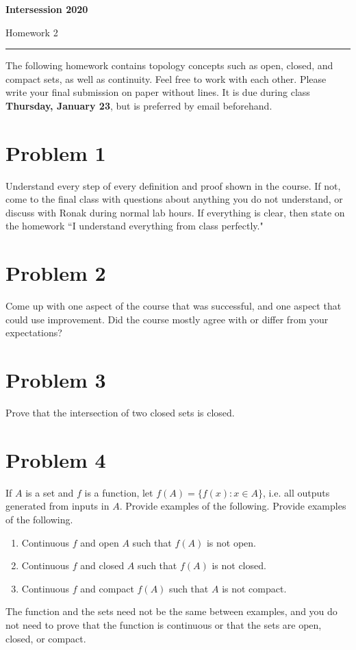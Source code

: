 \documentclass[11pt]{article}
\theoremstyle{plain}
\theoremstyle{definition}
\theoremstyle{remark}
\begin{document}

 \hfill {\bf Intersession 2020}

 \hfill 
{Homework 2}

\noindent \rule[0.1in]{\textwidth}{0.4pt}

The following homework contains topology concepts such as open, closed, and compact sets, as well as continuity. Feel free to work with each other. Please write your final submission on paper without lines. It is due during class {\bf Thursday, January 23}, but is preferred by email beforehand.


\section*{Problem 1}

Understand every step of every definition and proof shown in the course. If not, come to the final class with questions about anything you do not understand, or discuss with Ronak during normal lab hours. If everything is clear, then state on the homework ``I understand everything from class perfectly."

\section*{Problem 2}

Come up with one aspect of the course that was successful, and one aspect that could use improvement. Did the course mostly agree with or differ from your expectations?

\section*{Problem 3}

Prove that the intersection of two closed sets is closed.

\section*{Problem 4}

If $A$ is a set and $f$ is a function, let $f(A) = \{f(x) : x \in A\}$, i.e. all outputs generated from inputs in $A$. Provide examples of the following.
Provide examples of the following. 
\begin{enumerate}
    \item Continuous $f$ and open $A$ such that $f(A)$ is not open.
    \item Continuous $f$ and closed $A$ such that $f(A)$ is not closed.
    \item Continuous $f$ and compact $f(A)$ such that $A$ is not compact.
\end{enumerate}
The function and the sets need not be the same between examples, and you do not need to prove that the function is continuous or that the sets are open, closed, or compact.
\end{document}
